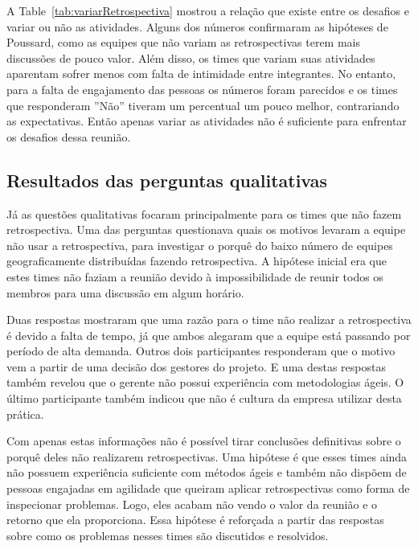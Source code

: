 \documentclass[12pt]{article}
\begin{document}
A Table~\ref{tab:variarRetrospectiva} mostrou a relação que existe entre os desafios e variar ou não as atividades. Alguns dos números confirmaram as hipóteses de Poussard, como as equipes que não variam as retrospectivas terem mais discussões de pouco valor. Além disso, os times que variam suas atividades aparentam sofrer menos com falta de intimidade entre integrantes. No entanto, para a falta de engajamento das pessoas os números foram parecidos e os times que responderam ''Não'' tiveram um percentual um pouco melhor, contrariando as expectativas. Então apenas variar as atividades não é suficiente para enfrentar os desafios dessa reunião.

\subsection{Resultados das perguntas qualitativas}

Já as questões qualitativas focaram principalmente para os times que não fazem retrospectiva. Uma das perguntas questionava quais os motivos levaram a equipe não usar a retrospectiva, para investigar o porquê do baixo número de equipes geograficamente distribuídas fazendo retrospectiva. A hipótese inicial era que estes times não faziam a reunião devido à impossibilidade de reunir todos os membros para uma discussão em algum horário.

Duas respostas mostraram que uma razão para o time não realizar a retrospectiva é devido a falta de tempo, já que ambos alegaram que a equipe está passando por período de alta demanda. Outros dois participantes responderam que o motivo vem a partir de uma decisão dos gestores do projeto. E uma destas respostas também revelou que o gerente não possui experiência com metodologias ágeis. O último participante também indicou que não é cultura da empresa utilizar desta prática. 

Com apenas estas informações não é possível tirar conclusões definitivas sobre o porquê deles não realizarem retrospectivas. Uma hipótese é que esses times ainda não possuem experiência suficiente com métodos ágeis e também não dispõem de pessoas engajadas em agilidade que queiram aplicar retrospectivas como forma de inspecionar problemas. Logo, eles acabam não vendo o valor da reunião e o retorno que ela proporciona. Essa hipótese é reforçada a partir das respostas sobre como os problemas nesses times são discutidos e resolvidos.
\end{document}
